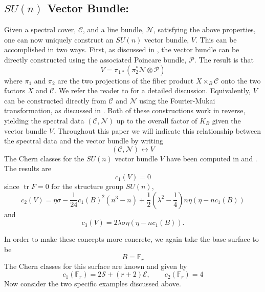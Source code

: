 \documentclass[a4paper,12pt]{article}
\numberwithin{equation}{section}
\def\cC{{\mathcal C}}
\def\cE{{\mathcal E}}
\def\cN{{\mathcal N}}
\def\cS{{\mathcal S}}
\theoremstyle{plain}
\begin{document}
\subsection*{$SU(n)$ Vector Bundle:}

Given a spectral cover, $\cC$, and a line bundle, $\cN$, satisfying the above
properties, one can now uniquely construct an $SU(n)$ vector bundle, $V$. This
can be accomplished in two ways. First, as discussed in \cite{FMW, don2}, 
the vector bundle
can be directly constructed using the associated Poincare bundle,
${\mathcal P}$.
The result is that 
\begin{equation}
V=\pi_{1*}(\pi^{*}_{2}\cN\otimes {\mathcal P})
\label{eq:30}
\end{equation}
where $\pi_{1}$ and $\pi_{2}$ are the two projections of the fiber
product $X \times_{B} \cC$ onto the two factors $X$ and $\cC$. We refer the
reader to \cite{FMW, don2} for a detailed discussion. Equivalently, $V$ can be
constructed directly from $\cC$ and $\cN$ using the Fourier-Mukai
transformation, as discussed in \cite{don3, mathpaper, AD}. 
Both of these constructions work in
reverse, yielding the spectral data $(\cC, \cN)$ up to the overall factor
of $K_B$ given the vector bundle $V$. 
Throughout this paper we will indicate this relationship between the
spectral data and the vector bundle by writing
\begin{equation}
(\cC,\cN) \longleftrightarrow V
\label{eq:31}
\end{equation}
The Chern classes for the $SU(n)$ vector bundle $V$ have been 
computed in \cite{FMW}
and \cite{don3, curio}. The results are
\begin{equation}
c_{1}(V)=0
\label{eq:32}
\end{equation}
since $\operatorname{tr} F=0$ for the structure group $SU(n)$,
\begin{equation}
c_2(V)=\eta\sigma-\frac{1}{24}c_1(B)^2(n^3-n)
+\frac{1}{2}(\lambda^2-\frac{1}{4})n\eta(\eta-nc_1(B)) 
\label{eq:33}
\end{equation}
and
\begin{equation}
c_3(V)= 2\lambda \sigma \eta(\eta-nc_1(B)). 
\label{eq:34} 
\end{equation}

In order to make these concepts more concrete, we again take the
base surface to be
\begin{equation}
B = {\mathbb F}_{r}
\label{eq:35}
\end{equation}
The Chern classes for this surface are known and given by
\begin{equation}
c_{1}({\mathbb F}_{r})=2\cS+(r+2)\cE, \qquad c_{2}({\mathbb F}_{r})=4
\label{eq:36}
\end{equation}
Now consider the two specific examples discussed above.
\end{document}
